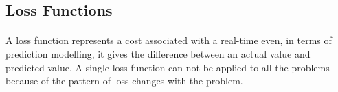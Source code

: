 \documentclass[runningheads]{llncs}
\begin{document}
\subsection{Loss Functions}
\paragraph{} A loss function represents a cost associated with a real-time even, in terms of prediction modelling, it gives the difference between an actual value and predicted value. A single loss function can not be applied to all the problems because of the pattern of loss changes with the problem.


\end{document}
